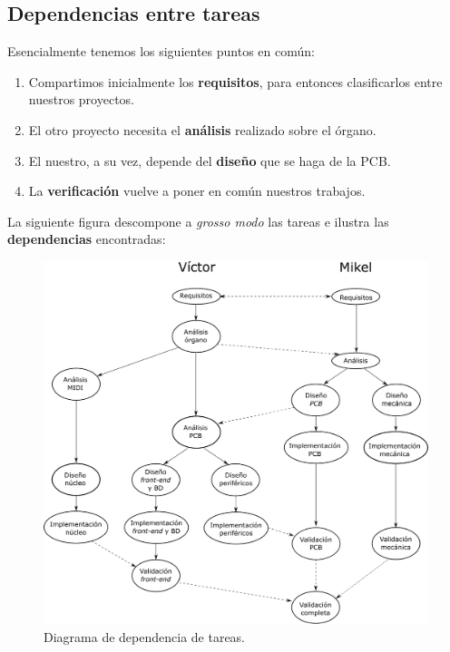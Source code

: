 \subsection{Dependencias entre tareas}

Esencialmente tenemos los siguientes puntos en común:

\begin{enumerate}
	\item Compartimos inicialmente los \textbf{requisitos}, para entonces clasificarlos entre nuestros proyectos.
	\item El otro proyecto necesita el \textbf{análisis} realizado sobre el órgano.
	\item El nuestro, a su vez, depende del \textbf{diseño} que se haga de la \acrshort{PCB}.
	\item La \textbf{verificación} vuelve a poner en común nuestros trabajos.
\end{enumerate}

La siguiente figura descompone a \textit{grosso modo} las tareas e ilustra las \textbf{dependencias} encontradas:

\smallskip

\begin{figure}[H]
	\noindent \begin{centering}
		\includegraphics[width=\linewidth]{capitulo2/planificacion}
		\par\end{centering}
	\smallskip
	\caption{\label{fig:planificacion} Diagrama de dependencia de tareas.}
\end{figure} 

